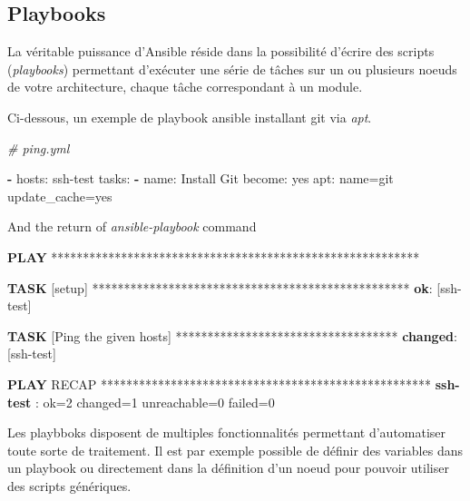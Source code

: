 \documentclass[12pt,a4paper]{article}
\newenvironment{Shaded}{}{}
\newcommand{\KeywordTok}[1]{\textcolor[rgb]{0.00,0.44,0.13}{\textbf{{#1}}}}
\newcommand{\CommentTok}[1]{\textcolor[rgb]{0.38,0.63,0.69}{\textit{{#1}}}}
\newcommand{\FunctionTok}[1]{\textcolor[rgb]{0.02,0.16,0.49}{{#1}}}
\newcommand{\NormalTok}[1]{{#1}}
\begin{document}
  \newpage

  \subsection{Playbooks}\label{playbooks}

  \bigskip

  La véritable puissance d'Ansible réside dans la possibilité d'écrire des
  scripts (\emph{playbooks}) permettant d'exécuter une série de tâches sur
  un ou plusieurs noeuds de votre architecture, chaque tâche correspondant
  à un module.

  \bigskip

  Ci-dessous, un exemple de playbook ansible installant git via
  \emph{apt}.

  \begin{Shaded}
  \begin{Highlighting}[]
  \CommentTok{# ping.yml}

  \KeywordTok{-} \FunctionTok{hosts:} \NormalTok{ssh-test}
    \FunctionTok{tasks:}
      \KeywordTok{-} \FunctionTok{name:} \NormalTok{Install Git}
        \FunctionTok{become:} \NormalTok{yes}
        \FunctionTok{apt:} \NormalTok{name=git update_cache=yes}
  \end{Highlighting}
  \end{Shaded}

  And the return of \emph{ansible-playbook} command

  \bigskip

  \begin{Shaded}
  \begin{Highlighting}[]
  \KeywordTok{PLAY} \NormalTok{**********************************************************}

  \KeywordTok{TASK} \NormalTok{[setup] **************************************************}
  \KeywordTok{ok}\NormalTok{: [ssh-test]}

  \KeywordTok{TASK} \NormalTok{[Ping the given hosts] ***********************************}
  \KeywordTok{changed}\NormalTok{: [ssh-test]}

  \KeywordTok{PLAY} \NormalTok{RECAP ****************************************************}
  \KeywordTok{ssh-test}       \NormalTok{: ok=2    changed=1    unreachable=0    failed=0   }
  \end{Highlighting}
  \end{Shaded}

  \bigskip

  Les playbboks disposent de multiples fonctionnalités permettant
  d'automatiser toute sorte de traitement. Il est par exemple possible de
  définir des variables dans un playbook ou directement dans la définition
  d'un noeud pour pouvoir utiliser des scripts génériques.
\end{document}

